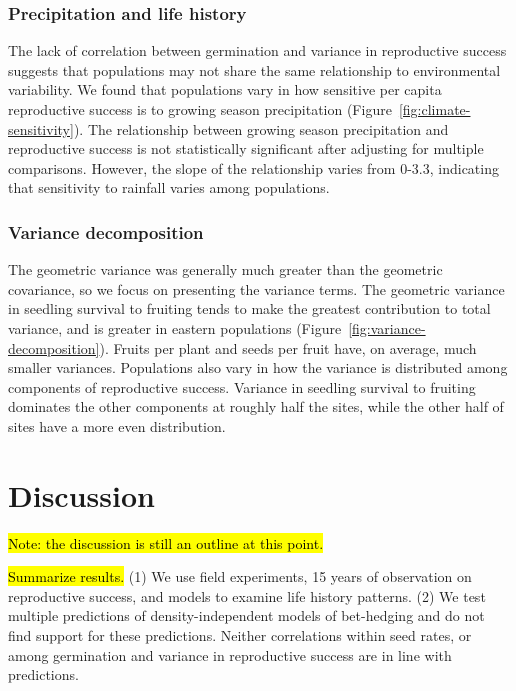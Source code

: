 \documentclass[12pt, oneside, titlepage]{article}   	%
\begin{document}
\subsubsection*{Precipitation and life history}

The lack of correlation between germination and variance in reproductive success suggests that populations may not share the same relationship to environmental variability. We found that populations vary in how sensitive per capita reproductive success is to growing season precipitation (Figure~\ref{fig:climate-sensitivity}). The relationship between growing season precipitation and reproductive success is not statistically significant after adjusting for multiple comparisons. However, the slope of the relationship varies from 0-3.3, indicating that sensitivity to rainfall varies among populations.

\subsubsection*{Variance decomposition}

The geometric variance was generally much greater than the geometric covariance, so we focus on presenting the variance terms. The geometric variance in seedling survival to fruiting tends to make the greatest contribution to total variance, and is greater in eastern populations (Figure~\ref{fig:variance-decomposition}). Fruits per plant and seeds per fruit have, on average, much smaller variances. Populations also vary in how the variance is distributed among components of reproductive success. Variance in seedling survival to fruiting dominates the other components at roughly half the sites, while the other half of sites have a more even distribution. 

\section*{Discussion}

\hl{Note: the discussion is still an outline at this point.}

\hl{Summarize results.} (1) We use field experiments, 15 years of observation on reproductive success, and models to examine life history patterns. (2) We test multiple predictions of density-independent models of bet-hedging and do not find support for these predictions. Neither correlations within seed rates, or among germination and variance in reproductive success are in line with predictions. 
\end{document}
